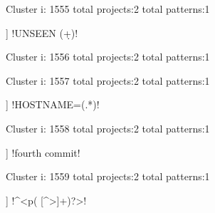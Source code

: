 Cluster i: 1555
total projects:2
total patterns:1
\begin{multicols}{1}
\begin{description}[noitemsep,topsep=0pt]
\item [[2] ] \cverb!UNSEEN (\d+)!
\end{description}
\end{multicols}







Cluster i: 1556
total projects:2
total patterns:1
\begin{multicols}{1}
\begin{description}[noitemsep,topsep=0pt]
\item [[2] ] \cverb!->\s*(\S+)$!
\end{description}
\end{multicols}







Cluster i: 1557
total projects:2
total patterns:1
\begin{multicols}{1}
\begin{description}[noitemsep,topsep=0pt]
\item [[2] ] \cverb!HOSTNAME=(.*)!
\end{description}
\end{multicols}







Cluster i: 1558
total projects:2
total patterns:1
\begin{multicols}{1}
\begin{description}[noitemsep,topsep=0pt]
\item [[2] ] \cverb!fourth commit!
\end{description}
\end{multicols}







Cluster i: 1559
total projects:2
total patterns:1
\begin{multicols}{1}
\begin{description}[noitemsep,topsep=0pt]
\item [[2] ] \cverb!^<p( [^>]+)?>!
\end{description}
\end{multicols}







